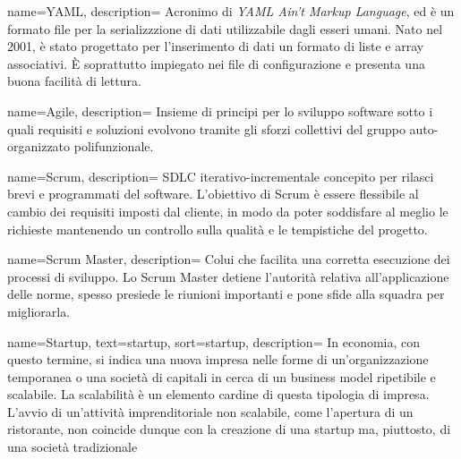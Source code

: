  {
  name=YAML,
  description={
Acronimo di \textit{YAML Ain't Markup Language}, ed è un formato file
per la serializzzione di dati utilizzabile dagli esseri umani. Nato nel 2001,
è stato progettato per l'inserimento di dati un formato di liste e array
associativi. È soprattutto impiegato nei file di configurazione e
presenta una buona facilità di lettura.
}
}

 {
  name=Agile,
  description={
Insieme di principi per lo sviluppo software sotto i quali requisiti e
soluzioni evolvono tramite gli sforzi collettivi del gruppo auto-organizzato
polifunzionale.
}
}

 {
  name=Scrum,
  description={
SDLC iterativo-incrementale concepito per rilasci brevi e programmati del
software. L'obiettivo di Scrum è essere flessibile al cambio dei requisiti
imposti dal cliente, in modo da poter soddisfare al meglio le richieste
mantenendo un controllo sulla qualità e le tempistiche del progetto.
}
}

 {
  name=Scrum Master,
  description={
Colui che facilita una corretta esecuzione dei processi di sviluppo. Lo Scrum
Master detiene l'autorità relativa all'applicazione delle norme, spesso
presiede le riunioni importanti e pone sfide alla squadra per migliorarla.
}
}

{
  name=Startup,
  text=startup,
  sort=startup,
  description={
In economia, con questo termine, si indica una nuova impresa
nelle forme di un'organizzazione temporanea o una società di capitali in cerca
di un business model ripetibile e scalabile.
La scalabilità è un elemento cardine di questa tipologia di impresa. L'avvio di
un'attività imprenditoriale non scalabile, come l'apertura di un ristorante,
non coincide dunque con la creazione di una startup ma, piuttosto, di una
società tradizionale
}
}


